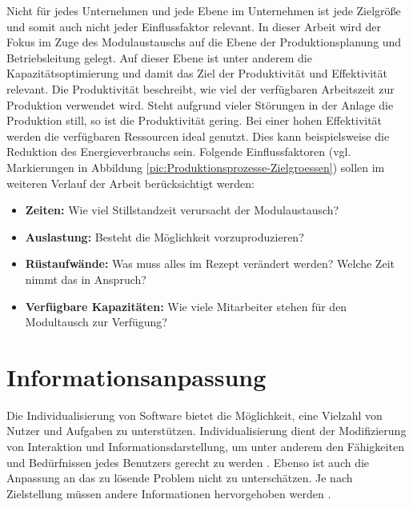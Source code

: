 Nicht für jedes Unternehmen und jede Ebene im Unternehmen ist jede Zielgröße und somit auch nicht jeder Einflussfaktor relevant. In dieser Arbeit wird der Fokus im Zuge des Modulaustauschs auf die Ebene der Produktionsplanung und Betriebsleitung gelegt. Auf dieser Ebene ist unter anderem die Kapazitätsoptimierung und damit das Ziel der Produktivität und Effektivität relevant. Die Produktivität beschreibt, wie viel der verfügbaren Arbeitszeit zur Produktion verwendet wird. Steht aufgrund vieler Störungen in der Anlage die Produktion still, so ist die Produktivität gering. Bei einer hohen Effektivität werden die verfügbaren Ressourcen ideal genutzt. Dies kann beispielsweise die Reduktion des Energieverbrauchs sein. Folgende Einflussfaktoren (vgl. Markierungen in Abbildung \ref{pic:Produktionsprozesse-Zielgroessen}) sollen im weiteren Verlauf der Arbeit berücksichtigt werden:
\begin{itemize}
\item \textbf{Zeiten:} Wie viel Stillstandzeit verursacht der Modulaustausch?
\item \textbf{Auslastung:} Besteht die Möglichkeit vorzuproduzieren?
\item \textbf{Rüstaufwände:} Was muss alles im Rezept verändert werden? Welche Zeit nimmt das in Anspruch?
\item \textbf{Verfügbare Kapazitäten:} Wie viele Mitarbeiter stehen für den Modultausch zur Verfügung? 
\end{itemize}

\section{Informationsanpassung}
Die Individualisierung von Software bietet die Möglichkeit, eine Vielzahl von Nutzer und Aufgaben zu unterstützen. Individualisierung dient der Modifizierung von Interaktion und Informationsdarstellung, um unter anderem den Fähigkeiten und Bedürfnissen jedes Benutzers gerecht zu werden \cite{Heinecke2012}. Ebenso ist auch die Anpassung an das zu lösende Problem nicht zu unterschätzen. Je nach Zielstellung müssen andere Informationen hervorgehoben werden \cite{Funke2015}.

